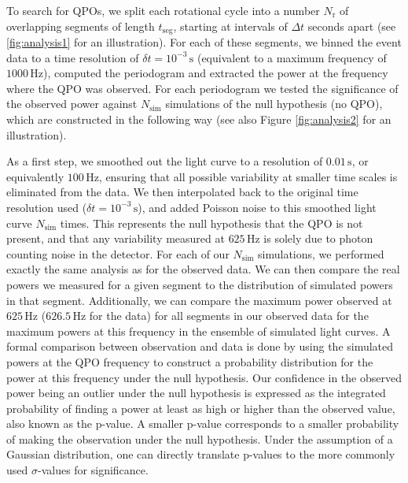 \documentclass{emulateapj}
\begin{document}
To search for QPOs, we split each rotational cycle into a number $N_\mathrm{r}$ of overlapping segments of length $t_{\mathrm{seg}}$, starting at intervals of $\Delta t$ seconds apart (see \ref{fig:analysis1} for an illustration). For each of these segments, we binned the event data to a time resolution of $\delta t = 10^{-3} \, \mathrm{s}$ (equivalent to a maximum frequency of $1000 \, \mathrm{Hz}$), computed the periodogram and extracted the power at the frequency where the QPO was observed. For each periodogram we tested the significance of the observed power against $N_{\mathrm{sim}}$ simulations of the null hypothesis (no QPO), which are constructed in the following way (see also Figure \ref{fig:analysis2} for an illustration).


As a first step, we smoothed out the light curve to a resolution of $0.01 \, \mathrm{s}$, or equivalently $100 \, \mathrm{Hz}$, ensuring that all possible variability at smaller time scales is eliminated from the data. We then interpolated back to the original time resolution used ($\delta t = 10^{-3} \, \mathrm{s}$), and added Poisson noise to this smoothed light curve $N_{\mathrm{sim}}$ times. This represents the null hypothesis that the QPO is not present, and that any variability measured at $625 \, \mathrm{Hz}$ is solely due to photon counting noise in the detector. For each of our $N_{\mathrm{sim}}$ simulations, we performed exactly the same analysis as for the observed data. We can then compare the real powers we measured for a given segment to the distribution of simulated powers in that segment. Additionally, we can compare the maximum power observed at $625 \, \mathrm{Hz}$ ($626.5 \, \mathrm{Hz}$ for the \rhessi data) for all segments in our observed data for the maximum powers at this frequency in the ensemble of simulated light curves. A formal comparison between observation and data is done by using the simulated powers at the QPO frequency to construct a probability distribution for the power at this frequency under the null hypothesis. Our confidence in the observed power being an outlier under the null hypothesis is expressed as the integrated probability of finding a power at least as high or higher than the observed value, also known as the p-value. A smaller p-value corresponds to a smaller probability of making the observation under the null hypothesis. Under the assumption of a Gaussian distribution, one can directly translate p-values to the more commonly used $\sigma$-values for significance. 
\end{document}
